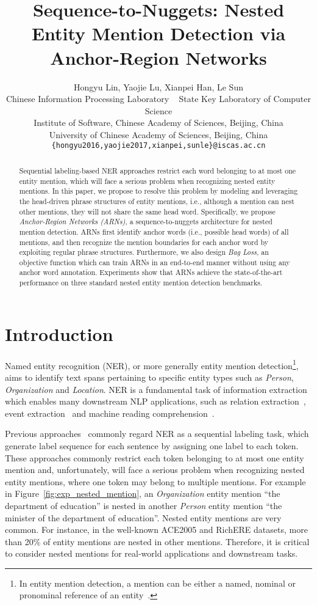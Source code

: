 \documentclass[11pt,a4paper]{article}
\title{Sequence-to-Nuggets: Nested Entity Mention Detection via \\ Anchor-Region Networks}
\author{Hongyu Lin, Yaojie Lu, Xianpei Han, Le Sun \\
Chinese Information Processing Laboratory ~ State Key Laboratory of Computer Science \\
Institute of Software, Chinese Academy of Sciences, Beijing, China\\
University of Chinese Academy of Sciences, Beijing, China \\
 {\tt \{hongyu2016,yaojie2017,xianpei,sunle\}@iscas.ac.cn}
}
\date{}
\begin{document}
\maketitle
\begin{abstract}
  Sequential labeling-based NER approaches restrict each word belonging to at most one entity mention, which will face a serious problem when recognizing nested entity mentions. In this paper, we propose to resolve this problem by modeling and leveraging the head-driven phrase structures of entity mentions, i.e., although a mention can nest other mentions, they will not share the same head word. Specifically, we propose \emph{Anchor-Region Networks (ARNs)}, a sequence-to-nuggets architecture for nested mention detection. ARNs first identify anchor words (i.e., possible head words) of all mentions, and then recognize the mention boundaries for each anchor word by exploiting regular phrase structures. Furthermore, we also design \emph{Bag Loss}, an objective function which can train ARNs in an end-to-end manner without using any anchor word annotation. Experiments show that ARNs achieve the state-of-the-art performance on three standard nested entity mention detection benchmarks.

\end{abstract}

\section{Introduction}
{
\renewcommand{\thefootnote}{\fnsymbol{footnote}}
}
Named entity recognition (NER), or more generally entity mention detection\footnote{In entity mention detection, a mention can be either a named, nominal or pronominal reference of an entity~\cite{N18-1079}.}, aims to identify text spans pertaining to specific entity types such as \emph{Person}, \emph{Organization} and \emph{Location}. NER is a fundamental task of information extraction which enables many downstream NLP applications, such as relation extraction~\cite{guodong2005exploring,mintz2009distant}, event extraction~\cite{ji2008refining,li2013joint} and machine reading comprehension~\cite{rajpurkar2016squad,wang2016multi}.

Previous approaches~\cite{zhou2002named,chieu2002named,bender2003maximum,settles2004biomedical,lample2016neural} commonly regard NER as a sequential labeling task, which generate label sequence for each sentence by assigning one label to each token. These approaches commonly restrict each token belonging to at most one entity mention and, unfortunately, will face a serious problem when recognizing nested entity mentions, where one token may belong to multiple mentions.
For example in Figure~\ref{fig:exp_nested_mention}, an \emph{Organization} entity mention ``the department of education'' is nested in another \emph{Person} entity mention ``the minister of the department of education''. Nested entity mentions are very common.  For instance, in the well-known ACE2005 and RichERE datasets, more than 20\% of entity mentions are nested in other mentions. Therefore, it is critical to consider nested mentions for real-world applications and downstream tasks.
\end{document}
